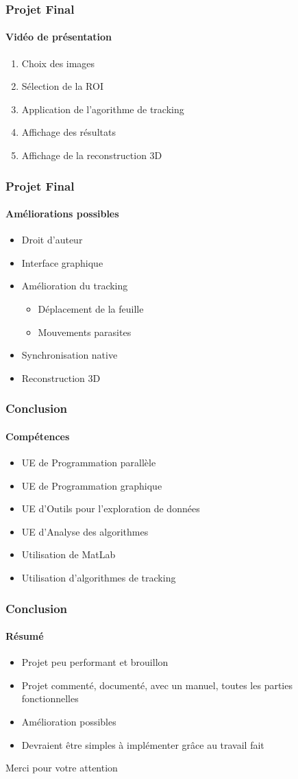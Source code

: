 \documentclass[12pt]{beamer}
\begin{document}
\begin{frame}
\frametitle{Projet Final}
\framesubtitle{Vidéo de présentation}
\begin{enumerate}
\item Choix des images
\item Sélection de la ROI
\item Application de l'agorithme de tracking
\item Affichage des résultats
\item Affichage de la reconstruction 3D
\end{enumerate}
\end{frame}

\begin{frame}
\frametitle{Projet Final}
\framesubtitle{Améliorations possibles}
\begin{itemize}
\item Droit d'auteur
\item Interface graphique
\item Amélioration du tracking
\begin{itemize}
\item Déplacement de la feuille
\item Mouvements parasites
\end{itemize}
\item Synchronisation native
\item Reconstruction 3D
\end{itemize}
\end{frame}

\begin{frame}
\frametitle{Conclusion}
\framesubtitle{Compétences}
\begin{itemize}
\item UE de Programmation parallèle
\item UE de Programmation graphique
\item UE d'Outils pour l'exploration de données
\item UE d'Analyse des algorithmes
\item Utilisation de MatLab
\item Utilisation d'algorithmes de tracking
\end{itemize}
\end{frame}

\begin{frame}
\frametitle{Conclusion}
\framesubtitle{Résumé}
\begin{itemize}
\item Projet peu performant et brouillon
\item Projet commenté, documenté, avec un manuel, toutes les parties fonctionnelles
\item Amélioration possibles
\item Devraient être simples à implémenter grâce au travail fait
\end{itemize}
\end{frame}

\begin{frame}
\Huge{\centerline{Merci pour votre attention}}
\end{frame}
\end{document}
